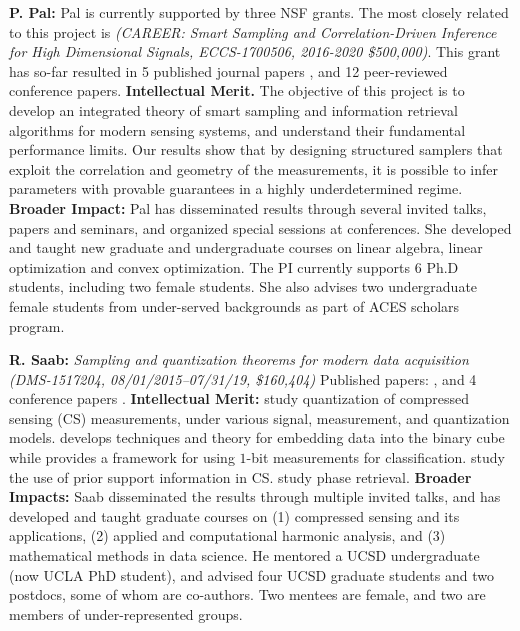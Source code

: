 {\bf P. Pal:} Pal is currently supported by three NSF grants. The most closely related to this project is {\em  (CAREER: Smart Sampling and Correlation-Driven Inference for High Dimensional Signals, ECCS-1700506, 2016-2020 \$500,000)}. This grant has so-far resulted in 5 published journal papers \cite{koochakzadeh2017performance,koochakzadeh2017sparse,koochakzadeh2018fundamental,PalSPMag,HOS}, and 12 peer-reviewed conference papers. {\bf Intellectual Merit.} The objective of this project is to develop an integrated theory of smart sampling and information retrieval algorithms for modern sensing systems, and understand their fundamental performance limits. Our results show that by designing structured samplers that exploit the correlation and geometry of the measurements, it is possible to infer parameters with provable guarantees in a highly underdetermined regime. {\bf Broader Impact:} Pal has disseminated results through several invited talks, papers and seminars, and organized special sessions at conferences. She developed and taught new graduate and undergraduate courses on linear algebra, linear optimization and convex optimization. The PI currently supports 6 Ph.D students, including two female students. She also advises two undergraduate female students from under-served backgrounds as part of ACES scholars program. 



{\bf R. Saab:} {\em Sampling and quantization theorems for modern data acquisition (DMS-1517204, 08/01/2015--07/31/19,
\$160,404)}
Published papers: \cite{knudson2016one, mansour2017recovery, needell2017weighted, SaabIEEEIT, needell2018simple, LybrandSaab2018, iwen2018phase, huynh2018fast, feng2019quantized}, and 4 conference papers \cite{needell2017simple, feng2017quantized, iwen2018phase, iwen2019new}.  {\bf Intellectual Merit:}  \cite{knudson2016one, SaabIEEEIT, feng2019quantized, LybrandSaab2018, iwen2019new} study quantization of compressed sensing (CS) measurements, under various signal, measurement, and quantization models. \cite{huynh2018fast} develops techniques and theory for embedding data into the binary cube while  \cite{needell2018simple} provides a framework for using $1$-bit  measurements for classification. \cite{mansour2017recovery, needell2017weighted} study  the use of prior support information  in CS. \cite{iwen2018phase, iwen2017phase} study phase retrieval. %
{\bf Broader Impacts: }  Saab disseminated the results through multiple invited talks, and has developed and taught graduate courses on (1) compressed sensing and its applications, (2) applied and computational harmonic analysis, and (3) mathematical methods in data science. He mentored a UCSD undergraduate (now UCLA PhD student), and advised four UCSD graduate students and two postdocs,  some of whom are co-authors. Two  mentees are female, and two are members of under-represented groups.%

